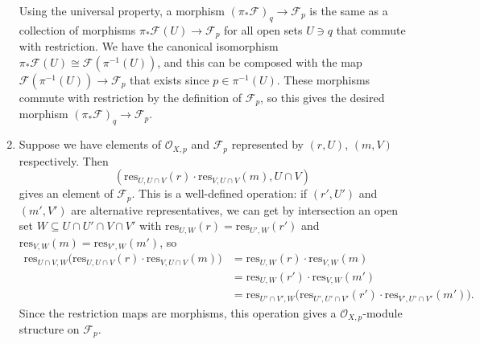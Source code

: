 \documentclass{report}
\newcommand{\res}{{\mathrm{res}}} %
\renewcommand{\O}{\mathscr{O}} %
\newcommand{\scrF}{\mathscr{F}}
\begin{document}
\begin{enumerate}[label=\textbf{2.2.\Alph*.}]
	      Using the universal property, a morphism $(\pi_*\scrF)_q\to\scrF_p$ is the
	      same as a collection of morphisms $\pi_*\scrF(U)\to\scrF_p$ for all open sets
	      $U\ni q$ that commute with restriction. We have the canonical
	      isomorphism $\pi_*\scrF(U)\cong\scrF(\pi^{-1}(U))$, and this can be composed
	      with the map $\scrF(\pi^{-1}(U))\to\scrF_p$ that exists since $p\in\pi^{-1}(U)$.
	      These morphisms commute with restriction by the definition of $\scrF_p$, so
	      this gives the desired morphism $(\pi_*\scrF)_q\to\scrF_p$.

	\item Suppose we have elements of $\O_{X,p}$ and $\scrF_p$ represented by
	      $(r,U)$, $(m,V)$ respectively. Then
	      \begin{equation*}
		      (\res_{U,U\cap V}(r)\cdot\res_{V,U\cap V}(m),U\cap V)
	      \end{equation*}
	      gives an element of $\scrF_p$. This is a well-defined operation: if
	      $(r',U')$ and $(m',V')$ are alternative representatives, we can get by
	      intersection an open set $W\subseteq U\cap U'\cap V\cap V'$ with
	      $\res_{U,W}(r) = \res_{U',W}(r')$ and $\res_{V,W}(m)=\res_{V',W}(m')$,
	      so
	      \begin{align*}
		      \res_{U\cap V,W}\bigl(\res_{U,U\cap V}(r)
		      \cdot\res_{V,U\cap V}(m)\bigr)
		       & = \res_{U,W}(r)\cdot\res_{V,W}(m)                 \\
		       & = \res_{U,W}(r')\cdot\res_{V,W}(m')               \\
		       & = \res_{U'\cap V',W}\bigl(\res_{U',U'\cap V'}(r')
		      \cdot\res_{V',U'\cap V'}(m')\bigr).
	      \end{align*}
	      Since the restriction maps are morphisms, this operation gives a
	      $\O_{X,p}$-module structure on $\scrF_p$.
\end{enumerate}
\end{document}
